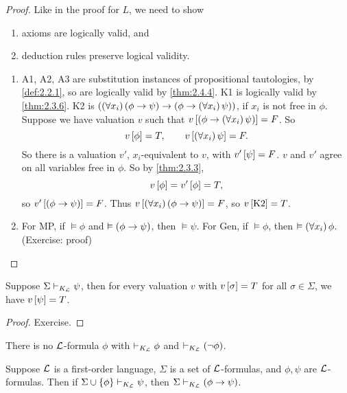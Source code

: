 \begin{proof}
Like in the proof for $ L $, we need to show
\begin{enumerate}
\item axioms are logically valid, and
\item deduction rules preserve logical validity.
\end{enumerate}
\begin{enumerate}
\item A1, A2, A3 are substitution instances of propositional tautologies, by \ref{def:2.2.1}, so are logically valid by \ref{thm:2.4.4}. K1 is logically valid by \ref{thm:2.3.6}. K2 is $ \impb{\fab{x_i}\impb{\phi}{\psi}}{\impb{\phi}{\fab{x_i}\psi}} $, if $ x_i $ is not free in $ \phi $. Suppose we have valuation $ v $ such that $ v\sb{\impb{\phi}{\fab{x_i}\psi}} = F $. So
$$ v\sb{\phi} = T, \qquad v\sb{\fab{x_i}\psi} = F. $$
So there is a valuation $ v' $, $ x_i $-equivalent to $ v $, with $ v'\sb{\psi} = F $. $ v $ and $ v' $ agree on all variables free in $ \phi $. So by \ref{thm:2.3.3},
$$ v\sb{\phi} = v'\sb{\phi} = T, $$
so $ v'\sb{\impb{\phi}{\psi}} = F $. Thus $ v\sb{\fab{x_i}\impb{\phi}{\psi}} = F $, so $ v\sb{\text{K2}} = T $.
\item For MP, if $ \vDash \phi $ and $ \vDash \impb{\phi}{\psi} $, then $ \vDash \psi $. For Gen, if $ \vDash \phi $, then $ \vDash \fab{x_i}\phi $. (Exercise: proof)
\end{enumerate}
\end{proof}

\pagebreak

\begin{example1}
\label{eg:2.4.6}
Suppose $ \Sigma \vdash_{K_{\LL}} \psi $, then for every valuation $ v $ with $ v\sb{\sigma} = T $ for all $ \sigma \in \Sigma $, we have $ v\sb{\psi} = T $.
\end{example1}

\begin{proof}
Exercise.
\end{proof}

\begin{corollary}
\label{cor:2.4.7}
There is no $ \LL $-formula $ \phi $ with $ \vdash_{K_{\LL}} \phi $ and $ \vdash_{K_{\LL}} \notb{\phi} $.
\end{corollary}

\begin{theorem}
Suppose $ \LL $ is a first-order language, $ \Sigma $ is a set of $ \LL $-formulas, and $ \phi, \psi $ are $ \LL $-formulas. Then if $ \Sigma \cup \cb{\phi} \vdash_{K_{\LL}} \psi $, then $ \Sigma \vdash_{K_{\LL}} \impb{\phi}{\psi} $.
\end{theorem}

